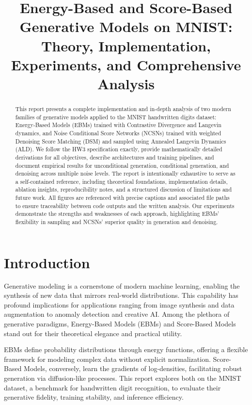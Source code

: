 \documentclass[a4paper,12pt]{article}
\title{Energy-Based and Score-Based Generative Models on MNIST: Theory, Implementation, Experiments, and Comprehensive Analysis}
\author{\IEEEauthorblockN{Student Name \quad Student Number}
\IEEEauthorblockA{School of Electrical and Computer Engineering\\
University of Tehran\\
Email: student@example.com}}
\begin{document}
\maketitle

\tableofcontents
\newpage
\listoffigures
\newpage
\listoftables
\newpage

\begin{abstract}
This report presents a complete implementation and in-depth analysis of two modern families of generative models applied to the MNIST handwritten digits dataset: Energy-Based Models (EBMs) trained with Contrastive Divergence and Langevin dynamics, and Noise Conditional Score Networks (NCSNs) trained with weighted Denoising Score Matching (DSM) and sampled using Annealed Langevin Dynamics (ALD). We follow the HW3 specification exactly, provide mathematically detailed derivations for all objectives, describe architectures and training pipelines, and document empirical results for unconditional generation, conditional generation, and denoising across multiple noise levels. The report is intentionally exhaustive to serve as a self-contained reference, including theoretical foundations, implementation details, ablation insights, reproducibility notes, and a structured discussion of limitations and future work. All figures are referenced with precise captions and associated file paths to ensure traceability between code outputs and the written analysis. Our experiments demonstrate the strengths and weaknesses of each approach, highlighting EBMs' flexibility in sampling and NCSNs' superior quality in generation and denoising.
\end{abstract}

\newpage
\section{Introduction}
Generative modeling is a cornerstone of modern machine learning, enabling the synthesis of new data that mirrors real-world distributions. This capability has profound implications for applications ranging from image synthesis and data augmentation to anomaly detection and creative AI. Among the plethora of generative paradigms, Energy-Based Models (EBMs) and Score-Based Models stand out for their theoretical elegance and practical utility.

EBMs define probability distributions through energy functions, offering a flexible framework for modeling complex data without explicit normalization. Score-Based Models, conversely, learn the gradients of log-densities, facilitating robust generation via diffusion-like processes. This report explores both on the MNIST dataset, a benchmark for handwritten digit recognition, to evaluate their generative fidelity, training stability, and inference efficiency.
\end{document}
